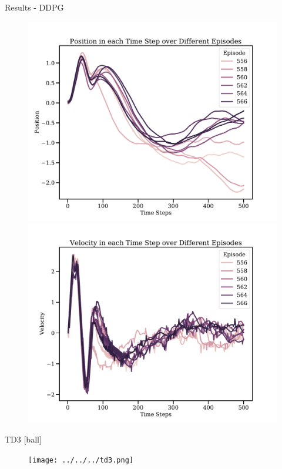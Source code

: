 \documentclass[10pt]{beamer}
\begin{document}
\begin{frame}[fragile]{Results - DDPG}
\begin{figure}[!htb]
  \includegraphics[width=\linewidth]{../results/ddpg_res_Position.pdf}
\endminipage\hfill
{}
  \includegraphics[width=\linewidth]{../results/ddpg_res_Velocity.pdf}
\endminipage\hfill
\end{figure}
\end{frame}


\begin{frame}[fragile]{TD3}
[ball]
  \begin{figure}
   \texttt{[image: ../../../td3.png]}
  \end{figure}
\end{frame}
\end{document}
